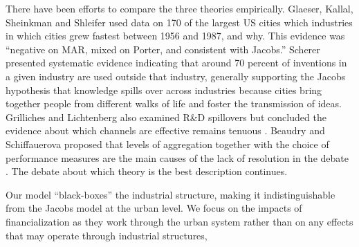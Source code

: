There have been efforts to compare the three theories empirically. Glaeser, Kallal, Sheinkman and Shleifer \cite{glaeserGrowthCities1991} used data on 170 of the largest US cities which industries in which cities grew fastest between 1956 and 1987, and why. %
This evidence was ``negative on MAR, mixed on Porter, and consistent with Jacobs.'' Scherer \cite{schererInterindustryTechnologyFlows1982} presented systematic evidence indicating that around 70 percent of inventions in a given industry are used outside that industry, generally supporting the Jacobs hypothesis that knowledge spills over across industries because cities bring together people from different walks of life and foster the transmission of ideas. Grilliches and Lichtenberg also examined R\&D spillovers but concluded the evidence about which channels are effective remains tenuous \cite{grilichesInterindustryTechnologyFlows1984}. Beaudry and Schiffauerova proposed that levels of aggregation together with the choice of performance measures are the main causes of the lack of resolution in the debate  \cite{beaudryWhoRightMarshall2009}. The debate about which theory is the best description continues. 

Our model ``black-boxes'' the industrial structure, making it indistinguishable from the Jacobs model at the urban level. We focus on the impacts of financialization as they work through the urban system rather than on any effects that may operate through industrial structures,


